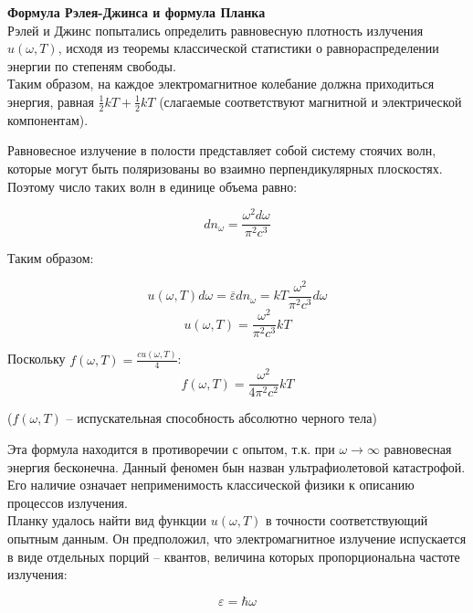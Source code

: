 \documentclass{article}
\begin{document}
	\textbf{Формула Рэлея-Джинса и формула Планка}\\

	Рэлей и Джинс попытались определить равновесную плотность излучения $u(\omega, T)$, исходя из теоремы классической статистики о равнораспределении энергии по степеням свободы.\\

	Таким образом, на каждое электромагнитное колебание должна приходиться энергия, равная $\frac{1}{2}kT + \frac{1}{2}kT$ (слагаемые соответствуют магнитной и электрической компонентам).

	Равновесное излучение в полости представляет собой систему стоячих волн, которые могут быть поляризованы во взаимно перпендикулярных плоскостях. Поэтому число таких волн в единице объема равно:

	\begin{equation}
		dn_\omega = \frac{\omega^2 d\omega}{\pi^2 c^3}
	\end{equation}

	Таким образом:

	\begin{equation}
		u(\omega,T)d\omega = \overline\varepsilon dn_\omega = kT\frac{\omega^2}{\pi^2 c^3} d\omega
	\end{equation}
	\begin{equation}
		u(\omega,T) = \frac{\omega^2}{\pi^2 c^3} kT
	\end{equation}

	Поскольку $f(\omega,T)=\frac{cu(\omega,T)}{4}$:
	\begin{equation}
		f(\omega,T) = \frac{\omega^2}{4\pi^2 c^2} kT
	\end{equation}

	($f(\omega,T)$ -- испускательная способность абсолютно черного тела)

	Эта формула находится в противоречии с опытом, т.к. при $\omega\rightarrow\infty$ равновесная энергия бесконечна. Данный феномен бын назван ультрафиолетовой катастрофой. Его наличие означает неприменимость классической физики к описанию процессов излучения.\\

	Планку удалось найти вид функции $u(\omega,T)$ в точности соответствующий опытным данным. Он предположил, что электромагнитное излучение испускается в виде отдельных порций -- квантов, величина которых пропорциональна частоте излучения:
	
	\begin{equation}
		\varepsilon = \hbar \omega
	\end{equation} 
\end{document}
